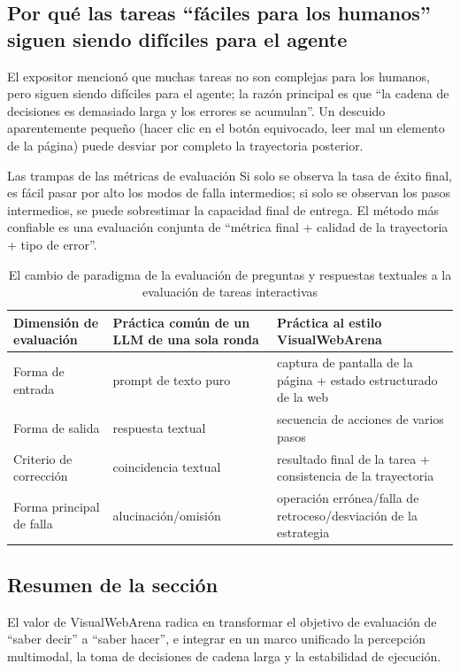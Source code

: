\subsection{Por qué las tareas ``fáciles para los humanos'' siguen siendo difíciles para el agente}
El expositor mencionó que muchas tareas no son complejas para los humanos, pero siguen siendo difíciles para el agente; la razón principal es que ``la cadena de decisiones es demasiado larga y los errores se acumulan''. Un descuido aparentemente pequeño (hacer clic en el botón equivocado, leer mal un elemento de la página) puede desviar por completo la trayectoria posterior.

\begin{warningbox}{Las trampas de las métricas de evaluación}
Si solo se observa la tasa de éxito final, es fácil pasar por alto los modos de falla intermedios; si solo se observan los pasos intermedios, se puede sobrestimar la capacidad final de entrega. El método más confiable es una evaluación conjunta de ``métrica final + calidad de la trayectoria + tipo de error''.
\end{warningbox}

\begin{table}[H]
\centering
\small
\begin{tabular}{p{2.8cm}p{4.0cm}p{4.2cm}}
\toprule
\textbf{Dimensión de evaluación} & \textbf{Práctica común de un LLM de una sola ronda} & \textbf{Práctica al estilo VisualWebArena} \\
\midrule
Forma de entrada & prompt de texto puro & captura de pantalla de la página + estado estructurado de la web \\
Forma de salida & respuesta textual & secuencia de acciones de varios pasos \\
Criterio de corrección & coincidencia textual & resultado final de la tarea + consistencia de la trayectoria \\
Forma principal de falla & alucinación/omisión & operación errónea/falla de retroceso/desviación de la estrategia \\
\bottomrule
\end{tabular}
\caption{El cambio de paradigma de la evaluación de preguntas y respuestas textuales a la evaluación de tareas interactivas}
\end{table}

\subsection{Resumen de la sección}
El valor de VisualWebArena radica en transformar el objetivo de evaluación de ``saber decir'' a ``saber hacer'', e integrar en un marco unificado la percepción multimodal, la toma de decisiones de cadena larga y la estabilidad de ejecución.

